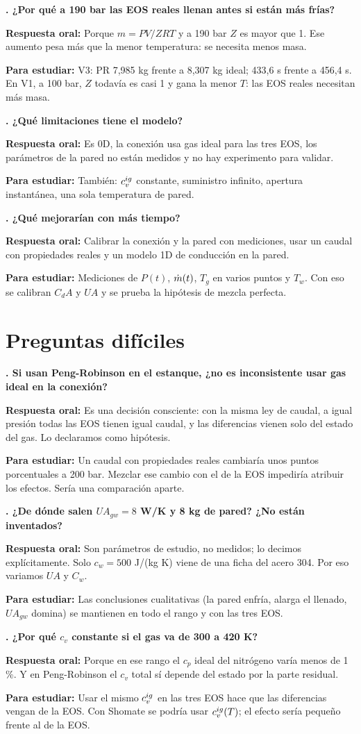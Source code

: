 \documentclass[11pt]{article}
\newcounter{preg}
\newcommand{\pregunta}[3]{\stepcounter{preg}%
\begin{tcolorbox}[colback=white,colframe=tinta!25,boxrule=0.5pt,sharp corners,left=6pt,right=6pt,top=4pt,bottom=4pt,breakable]
\textbf{\color{tinta}\thepreg. #1}\par\smallskip
\textbf{Respuesta oral:} #2\par\smallskip
{\color{gris}\small\textbf{Para estudiar:} #3}
\end{tcolorbox}}
\begin{document}
\pregunta{¿Por qué a 190 bar las EOS reales llenan antes si están más frías?}
{Porque $m=PV/ZRT$ y a 190 bar $Z$ es mayor que 1. Ese aumento pesa más que la menor temperatura: se necesita menos masa.}
{V3: PR 7,985 kg frente a 8,307 kg ideal; 433,6 s frente a 456,4 s. En V1, a 100 bar, $Z$ todavía es casi 1 y gana la menor $T$: las EOS reales necesitan más masa.}

\pregunta{¿Qué limitaciones tiene el modelo?}
{Es 0D, la conexión usa gas ideal para las tres EOS, los parámetros de la pared no están medidos y no hay experimento para validar.}
{También: $c_v^{ig}$ constante, suministro infinito, apertura instantánea, una sola temperatura de pared.}

\pregunta{¿Qué mejorarían con más tiempo?}
{Calibrar la conexión y la pared con mediciones, usar un caudal con propiedades reales y un modelo 1D de conducción en la pared.}
{Mediciones de $P(t)$, $\dot m(t)$, $T_g$ en varios puntos y $T_w$. Con eso se calibran $C_dA$ y $UA$ y se prueba la hipótesis de mezcla perfecta.}

\section{Preguntas difíciles}
\pregunta{Si usan Peng-Robinson en el estanque, ¿no es inconsistente usar gas ideal en la conexión?}
{Es una decisión consciente: con la misma ley de caudal, a igual presión todas las EOS tienen igual caudal, y las diferencias vienen solo del estado del gas. Lo declaramos como hipótesis.}
{Un caudal con propiedades reales cambiaría unos puntos porcentuales a 200 bar. Mezclar ese cambio con el de
la EOS impediría atribuir los efectos. Sería una comparación aparte.}

\pregunta{¿De dónde salen $UA_{gw}=8$ W/K y 8 kg de pared? ¿No están inventados?}
{Son parámetros de estudio, no medidos; lo decimos explícitamente. Solo $c_w=500$ J/(kg K) viene de una ficha del acero 304. Por eso variamos $UA$ y $C_w$.}
{Las conclusiones cualitativas (la pared enfría, alarga el llenado, $UA_{gw}$ domina) se mantienen en todo el rango y con las tres EOS.}

\pregunta{¿Por qué $c_v$ constante si el gas va de 300 a 420 K?}
{Porque en ese rango el $c_p$ ideal del nitrógeno varía menos de 1 \%. Y en Peng-Robinson el $c_v$ total sí depende del estado por la parte residual.}
{Usar el mismo $c_v^{ig}$ en las tres EOS hace que las diferencias vengan de la EOS. Con Shomate se podría usar $c_v^{ig}(T)$; el efecto sería pequeño frente al de la EOS.}
\end{document}
